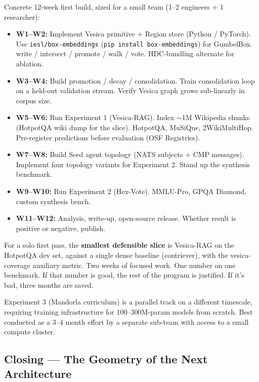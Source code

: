 \documentclass[11pt,a4paper]{article}
\begin{document}
Concrete 12-week first build, sized for a small team (1--2 engineers $+$ 1 researcher):

\begin{itemize}[leftmargin=*]
  \item \textbf{W1--W2:} Implement Vesica primitive $+$ Region store (Python / PyTorch). Use \texttt{iesl/box-embeddings} (\texttt{pip install box-embeddings}) for GumbelBox. write / intersect / promote / walk / vote. HDC-bundling alternate for ablation.
  \item \textbf{W3--W4:} Build promotion / decay / consolidation. Train consolidation loop on a held-out validation stream. Verify Vesica graph grows sub-linearly in corpus size.
  \item \textbf{W5--W6:} Run Experiment 1 (Vesica-RAG). Index $\sim$1M Wikipedia chunks (HotpotQA wiki dump for the slice). HotpotQA, MuSiQue, 2WikiMultiHop. Pre-register predictions before evaluation (OSF Registries).
  \item \textbf{W7--W8:} Build Seed agent topology (NATS subjects $+$ CMP messages). Implement four topology variants for Experiment 2. Stand up the synthesis benchmark.
  \item \textbf{W9--W10:} Run Experiment 2 (Hex-Vote). MMLU-Pro, GPQA Diamond, custom synthesis bench.
  \item \textbf{W11--W12:} Analysis, write-up, open-source release. Whether result is positive or negative, publish.
\end{itemize}

For a solo first pass, the \textbf{smallest defensible slice} is Vesica-RAG on the HotpotQA dev set, against a single dense baseline (contriever), with the vesica-coverage auxiliary metric. Two weeks of focused work. One number on one benchmark. If that number is good, the rest of the program is justified. If it's bad, three months are saved.

Experiment 3 (Mandorla curriculum) is a parallel track on a different timescale, requiring training infrastructure for 100--300M-param models from scratch. Best conducted as a 3--4 month effort by a separate sub-team with access to a small compute cluster.

\subsection{Closing --- The Geometry of the Next Architecture}
\end{document}

